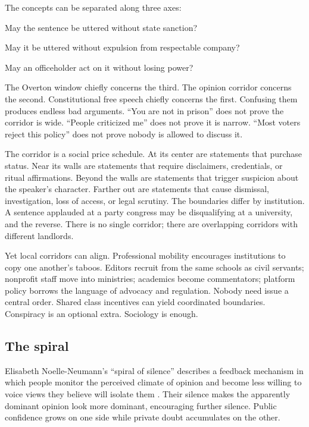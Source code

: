 ﻿\documentclass[12pt,a4paper]{book}
\begin{document}
The concepts can be separated along three axes:

\begin{description}[leftmargin=2.4em,style=nextline]
  \item[Legal permission.] May the sentence be uttered without state sanction?
  \item[Discursive permission.] May it be uttered without expulsion from respectable company?
  \item[Political feasibility.] May an officeholder act on it without losing power?
\end{description}

The Overton window chiefly concerns the third. The opinion corridor concerns the second. Constitutional free speech chiefly concerns the first. Confusing them produces endless bad arguments. “You are not in prison” does not prove the corridor is wide. “People criticized me” does not prove it is narrow. “Most voters reject this policy” does not prove nobody is allowed to discuss it.

The corridor is a social price schedule. At its center are statements that purchase status. Near its walls are statements that require disclaimers, credentials, or ritual affirmations. Beyond the walls are statements that trigger suspicion about the speaker's character. Farther out are statements that cause dismissal, investigation, loss of access, or legal scrutiny. The boundaries differ by institution. A sentence applauded at a party congress may be disqualifying at a university, and the reverse. There is no single corridor; there are overlapping corridors with different landlords.

Yet local corridors can align. Professional mobility encourages institutions to copy one another's taboos. Editors recruit from the same schools as civil servants; nonprofit staff move into ministries; academics become commentators; platform policy borrows the language of advocacy and regulation. Nobody need issue a central order. Shared class incentives can yield coordinated boundaries. Conspiracy is an optional extra. Sociology is enough.

\subsection{The spiral}

Elisabeth Noelle-Neumann's “spiral of silence” describes a feedback mechanism in which people monitor the perceived climate of opinion and become less willing to voice views they believe will isolate them \cite{Noelle-Neumann}. Their silence makes the apparently dominant opinion look more dominant, encouraging further silence. Public confidence grows on one side while private doubt accumulates on the other.
\end{document}
